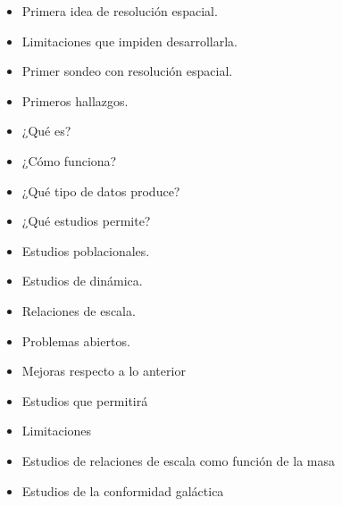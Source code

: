 \documentclass[xcolor=dvipsnames,4pt]{beamer}
\begin{document}
\begin{frame}{}
%
\begin{itemize}
\item Primera idea de resolución espacial.
\item Limitaciones que impiden desarrollarla.
\item Primer sondeo con resolución espacial.
\item Primeros hallazgos.
\end{itemize}
%
\end{frame}

\begin{frame}{}
%
\begin{itemize}
\item ¿Qué es?
\item ¿Cómo funciona?
\end{itemize}
%
\end{frame}

\begin{frame}{}
%
\begin{itemize}
\item ¿Qué tipo de datos produce?
\item ¿Qué estudios permite?
\end{itemize}
%
\end{frame}

\begin{frame}{}
%
\begin{itemize}
\item Estudios poblacionales.
\item Estudios de dinámica.
\item Relaciones de escala.
\item Problemas abiertos.
\end{itemize}
%
\end{frame}

\begin{frame}{}
%
\begin{itemize}
\item Mejoras respecto a lo anterior
\item Estudios que permitirá
\item Limitaciones
\end{itemize}
%
\end{frame}


\begin{frame}{}
%
\begin{itemize}
\item Estudios de relaciones de escala como función de la masa
\item Estudios de la conformidad galáctica
\end{itemize}
%
\end{frame}
\end{document}
